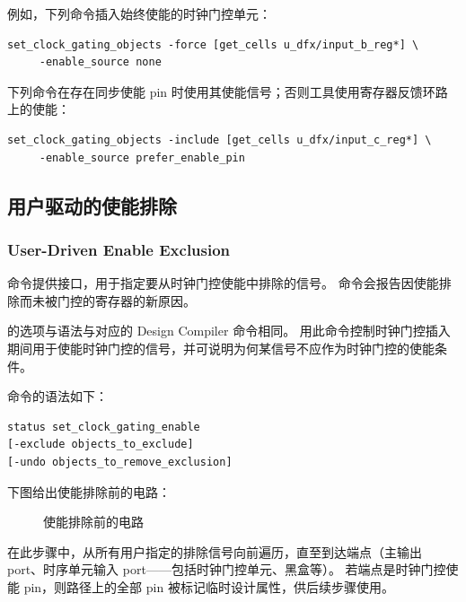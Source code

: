 例如，下列命令插入始终使能的时钟门控单元：
\begin{lstlisting}
set_clock_gating_objects -force [get_cells u_dfx/input_b_reg*] \
     -enable_source none
\end{lstlisting}

下列命令在存在同步使能 pin 时使用其使能信号；否则工具使用寄存器反馈环路上的使能：
\begin{lstlisting}
set_clock_gating_objects -include [get_cells u_dfx/input_c_reg*] \
     -enable_source prefer_enable_pin
\end{lstlisting}

\subsection{用户驱动的使能排除}
\subsubsection*{User-Driven Enable Exclusion}

 命令提供接口，用于指定要从时钟门控使能中排除的信号。
 命令会报告因使能排除而未被门控的寄存器的新原因。

\cmd{set\_clock\_gating\_enable} 的选项与语法与对应的 Design Compiler 命令相同。
用此命令控制时钟门控插入期间用于使能时钟门控的信号，并可说明为何某信号不应作为时钟门控的使能条件。

 命令的语法如下：
\begin{lstlisting}
status set_clock_gating_enable
[-exclude objects_to_exclude]
[-undo objects_to_remove_exclusion]
\end{lstlisting}

下图给出使能排除前的电路：

\begin{figure}[htbp]
\centering
{}
\caption{使能排除前的电路}
\label{fig:cg-en-excl-before}
\end{figure}

在此步骤中，从所有用户指定的排除信号向前遍历，直至到达端点（主输出 port、时序单元输入 port——包括时钟门控单元、黑盒等）。
若端点是时钟门控使能 pin，则路径上的全部 pin 被标记临时设计属性，供后续步骤使用。

